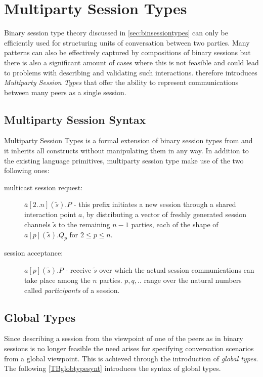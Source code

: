 		
		
\section{Multiparty Session Types}
\label{sec:mpsessiontypes}

Binary session type theory discussed in \autoref{sec:binsessiontypes} can only be efficiently used for structuring units of conversation between two parties. Many patterns can also be effectively captured by compositions of binary sessions but there is also a significant amount of cases where this is not feasible and could lead to problems with describing and validating such interactions. \cite{multiparty_sess_types} therefore introduces \textit{Multiparty Session Types} that offer the ability to represent communications between many peers as a single session.

\subsection{Multiparty Session Syntax}

Multiparty Session Types is a formal extension of binary session types from \cite{language_primitives} and it inherits all constructs without manipulating them in any way. In addition to the existing language primitives, multiparty session type make use of the two following ones:

\begin{description}
\item[multicast session request:] 
$\bar{a}[2..n](\tilde{s}).P$ - this prefix initiates a new session through a shared interaction point $a$, by distributing a vector of freshly generated session channels $\tilde{s}$ to the remaining $n-1$ parties, each of the shape of $a[p](\tilde{s}).Q_{p}$ for $ 2 \leq p \leq n$. 

\item[session acceptance:] $a[p](\tilde{s}).P$ - receive $\tilde{s}$ over which the actual session communications can take place among the $n$ parties. $p, q, ..$ range over the natural numbers called \textit{participants} of a session.
\end{description}

\subsection{Global Types}
Since describing a session from the viewpoint of one of the peers as in binary sessions is no longer feasible the need arises for specifying conversation scenarios from a global viewpoint. This is achieved through the introduction of \textit{global types}. The following \autoref{TBglobtypesynt} introduces the syntax of global types.


